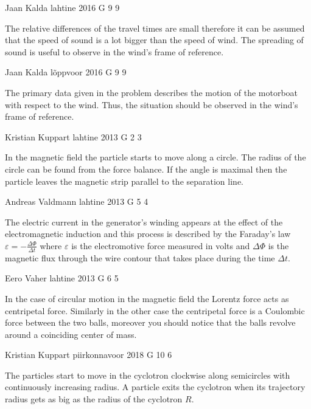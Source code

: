 \documentclass[11pt]{article}
\begin{document}
{Jaan Kalda} %
{lahtine} %
{2016} %
{G 9} %
{9} %
{

\ifEngHint
The relative differences of the travel times are small therefore it can be assumed that the speed of sound is a lot bigger than the speed of wind. The spreading of sound is useful to observe in the wind’s frame of reference.
\fi
}

{Jaan Kalda} %
{lõppvoor} %
{2016} %
{G 9} %
{9} %
{

\ifEngHint
The primary data given in the problem describes the motion of the motorboat with respect to the wind. Thus, the situation should be observed in the wind’s frame of reference.
\fi
}

{Kristian Kuppart} %
{lahtine} %
{2013} %
{G 2} %
{3} %
{

\ifEngHint
In the magnetic field the particle starts to move along a circle. The radius of the circle can be found from the force balance. If the angle is maximal then the particle leaves the magnetic strip parallel to the separation line.
\fi
}

{Andreas Valdmann} %
{lahtine} %
{2013} %
{G 5} %
{4} %
{

\ifEngHint
The electric current in the generator’s winding appears at the effect of the electromagnetic induction and this process is described by the Faraday’s law $\varepsilon = -\frac{\Delta\Phi}{\Delta t}$ where $\varepsilon$ is the electromotive force measured in volts and $\Delta\Phi$ is the magnetic flux through the wire contour that takes place during the time $\Delta t$.
\fi
}

{Eero Vaher} %
{lahtine} %
{2013} %
{G 6} %
{5} %
{

\ifEngHint
In the case of circular motion in the magnetic field the Lorentz force acts as centripetal force. Similarly in the other case the centripetal force is a Coulombic force between the two balls, moreover you should notice that the balls revolve around a coinciding center of mass.
\fi
}

{Kristian Kuppart} %
{piirkonnavoor} %
{2018} %
{G 10} %
{6} %
{

\ifEngHint
The particles start to move in the cyclotron clockwise along semicircles with continuously increasing radius. A particle exits the cyclotron when its trajectory radius gets as big as the radius of the cyclotron $R$.
\fi
}
\end{document}
